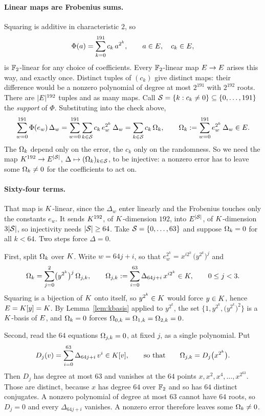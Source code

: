 \paragraph{Linear maps are Frobenius sums.} Squaring is additive in characteristic $2$, so
\[
\Phi(a)=\sum_{k=0}^{191}c_k\,a^{2^k},\qquad a\in E,\quad c_k\in E,
\]
is $\mathbb{F}_2$-linear for any choice of coefficients. Every $\mathbb{F}_2$-linear map $E\to E$ arises this way, and exactly once. Distinct tuples of $(c_k)$ give distinct maps: their difference would be a nonzero polynomial of degree at most $2^{191}$ with $2^{192}$ roots. There are $|E|^{192}$ tuples and as many maps. Call $\mathcal{S}=\{k:c_k\neq0\}\subseteq\{0,\dots,191\}$ the \emph{support} of $\Phi$. Substituting into the check above,
\begin{equation}
\sum_{w=0}^{191}\Phi(e_w)\,\Delta_w=\sum_{w=0}^{191}\sum_{k\in\mathcal{S}}c_k\,e_w^{2^k}\,\Delta_w=\sum_{k\in\mathcal{S}}c_k\,\Omega_k,
\qquad
\Omega_k:=\sum_{w=0}^{191}e_w^{2^k}\,\Delta_w\in E.
\label{eq:pairing}
\end{equation}
The $\Omega_k$ depend only on the error, the $c_k$ only on the randomness. So we need the map $K^{192}\to E^{|\mathcal{S}|}$, $\Delta\mapsto(\Omega_k)_{k\in\mathcal{S}}$, to be injective: a nonzero error has to leave some $\Omega_k\neq0$ for the coefficients to act on.

\paragraph{Sixty-four terms.} That map is $K$-linear, since the $\Delta_w$ enter linearly and the Frobenius touches only the constants $e_w$. It sends $K^{192}$, of $K$-dimension $192$, into $E^{|\mathcal{S}|}$, of $K$-dimension $3|\mathcal{S}|$, so injectivity needs $|\mathcal{S}|\ge64$. Take $\mathcal{S}=\{0,\dots,63\}$ and suppose $\Omega_k=0$ for all $k<64$. Two steps force $\Delta=0$.

First, split $\Omega_k$ over $K$. Write $w=64j+i$, so that $e_w^{2^k}=x^{i2^k}\,\bigl(y^{2^k}\bigr)^{j}$ and
\[
\Omega_k=\sum_{j=0}^{2}\bigl(y^{2^k}\bigr)^{j}\,\Omega_{j,k},
\qquad
\Omega_{j,k}:=\sum_{i=0}^{63}\Delta_{64j+i}\,x^{i2^k}\in K,\qquad 0\le j<3.
\]
Squaring is a bijection of $K$ onto itself, so $y^{2^k}\in K$ would force $y\in K$, hence $E=K[y]=K$. By Lemma~\ref{lem:kbasis} applied to $y^{2^k}$, the set $\bigl\{1,y^{2^k},\bigl(y^{2^k}\bigr)^{2}\bigr\}$ is a $K$-basis of $E$, and $\Omega_k=0$ forces $\Omega_{0,k}=\Omega_{1,k}=\Omega_{2,k}=0$.

Second, read the $64$ equations $\Omega_{j,k}=0$, at fixed $j$, as a single polynomial. Put
\[
D_j(v)=\sum_{i=0}^{63}\Delta_{64j+i}\,v^i\in K[v],
\qquad\text{so that}\qquad
\Omega_{j,k}=D_j\bigl(x^{2^k}\bigr).
\]
Then $D_j$ has degree at most $63$ and vanishes at the $64$ points $x,x^2,x^4,\dots,x^{2^{63}}$. Those are distinct, because $x$ has degree $64$ over $\mathbb{F}_2$ and so has $64$ distinct conjugates. A nonzero polynomial of degree at most $63$ cannot have $64$ roots, so $D_j=0$ and every $\Delta_{64j+i}$ vanishes. A nonzero error therefore leaves some $\Omega_k\neq0$.

